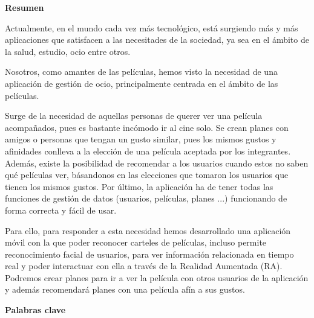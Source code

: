 
\newpage

\thispagestyle{empty}

\begin{center}

{\bf \Huge Resumen}

  \end{center}
\vspace{1cm}

Actualmente, en el mundo cada vez más tecnológico, está surgiendo más y más aplicaciones que satisfacen
a las necesitades de la sociedad, ya sea en el ámbito de la salud, estudio, ocio entre otros.

Nosotros, como amantes de las películas, hemos visto la necesidad de una aplicación de gestión de ocio,
principalmente centrada en el ámbito de las películas. 

Surge de la necesidad de aquellas personas de querer ver una película acompañados, pues es bastante 
incómodo ir al cine solo. Se crean planes con amigos o personas que tengan un gusto similar, pues los mismos
gustos y afinidades conlleva a la elección de una película aceptada por los integrantes. Además, existe la posibilidad
de recomendar a los usuarios cuando estos no saben qué películas ver, básandonos en las elecciones que tomaron
los usuarios que tienen los mismos gustos. Por último, la aplicación ha de tener todas las funciones de gestión de 
datos (usuarios, películas, planes ...) funcionando de forma correcta y fácil de usar.

Para ello, para responder a esta necesidad hemos desarrollado una aplicación móvil 
con la que poder reconocer carteles de películas, incluso permite reconocimiento facial de usuarios, para 
ver información relacionada en tiempo real y poder interactuar con ella a 
través de la Realidad Aumentada (RA). Podremos crear planes para ir a ver la película con otros 
usuarios de la aplicación y además recomendará planes con una película afín a sus gustos.

\vspace{1cm}


\begin{center}

{\bf \Large Palabras clave}

   \end{center}


